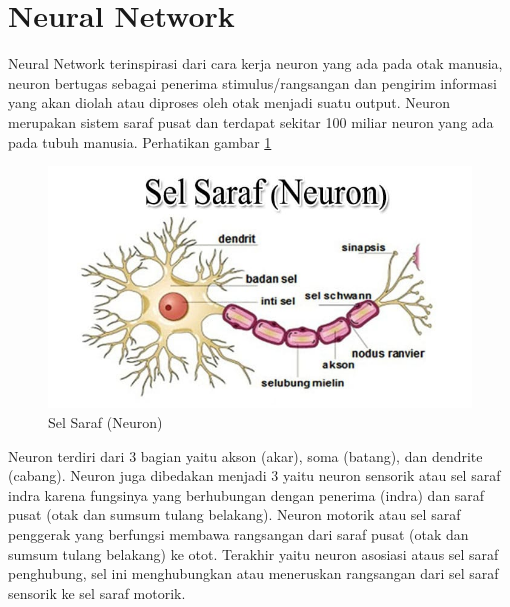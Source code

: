 \section{Neural Network}
Neural Network terinspirasi dari cara kerja neuron yang ada pada otak manusia, neuron bertugas sebagai penerima stimulus/rangsangan dan pengirim informasi yang akan diolah atau diproses oleh otak menjadi suatu output. Neuron merupakan sistem saraf pusat dan terdapat sekitar 100 miliar neuron yang ada pada tubuh manusia. Perhatikan gambar \ref{neuron}
\begin{figure}[H]
        \centerline{\includegraphics[scale=.45]{figures/neuron}}
        \caption{Sel Saraf (Neuron)}
		\label{neuron}
\end{figure}

Neuron terdiri dari 3 bagian yaitu akson (akar), soma (batang), dan dendrite (cabang). Neuron juga dibedakan menjadi 3 yaitu neuron sensorik atau sel saraf indra karena fungsinya yang berhubungan dengan penerima (indra) dan saraf pusat (otak dan sumsum tulang belakang). Neuron motorik atau sel saraf penggerak yang berfungsi membawa rangsangan dari saraf pusat (otak dan sumsum tulang belakang) ke otot. Terakhir yaitu neuron asosiasi ataus sel saraf penghubung, sel ini menghubungkan atau meneruskan rangsangan dari sel saraf sensorik ke sel saraf motorik.

